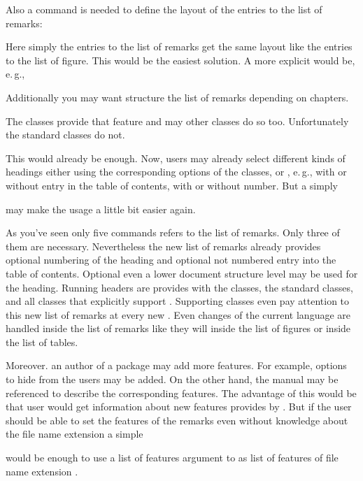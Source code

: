 Also a command is needed to define the layout of the entries
to the list of remarks:
\begin{lstcode}[belowskip=\dp\strutbox plus 1pt]
  \newcommand*{\l@remarkbox}{\l@figure}
\end{lstcode}
Here simply the entries to the list of remarks get the same layout like the
entries to the list of figure. This would be the easiest solution. A more
explicit would be, e.\,g.,
\begin{lstcode}[belowskip=\dp\strutbox plus 1pt]
  \newcommand*{\l@remarkbox}{\@dottedtocline{1}{1em}{1.5em}}
\end{lstcode}

Additionally you may want structure the list of
remarks depending on chapters.
\begin{lstcode}[belowskip=\dp\strutbox plus 1pt]
\end{lstcode}
The \KOMAScript{} classes provide that feature and may other classes do so
too. Unfortunately the standard classes do not.

This would already be enough. Now, users may already
select different kinds of headings either using the corresponding options of
the \KOMAScript{} classes, or , e.\,g., with or without entry
in the table of contents, with or without number. But a simply
\begin{lstcode}[belowskip=\dp\strutbox plus 1pt]
  \newcommand*{\listofremarkboxes}{\listoftoc{lor}}
\end{lstcode}
may make the usage a little bit easier again.

As you've seen only five commands refers to the list of remarks. Only three of
them are necessary. Nevertheless the new list of remarks already provides
optional numbering of the heading and optional not numbered entry into the
table of contents. Optional even a lower document structure level may be used
for the heading. Running headers are provides with the \KOMAScript{} classes,
the standard classes, and all classes that explicitly support
. Supporting classes even pay attention to this new list of
remarks at every new . Even changes of the current language are
handled inside the list of remarks like they will inside the list of figures
or inside the list of tables.

Moreover. an author of a package may add more
features. For example, options to hide  from the users may be
added. On the other hand, the  manual may be referenced to
describe the corresponding features. The advantage of this would be that user
would get information about new features provides by . But
if the user should be able to set the features of the remarks even without
knowledge about the file name extension  a simple
\begin{lstcode}[belowskip=\dp\strutbox plus 1pt]
  \newcommand*{\setupremarkboxes}{\setuptoc{lor}}
\end{lstcode}
would be enough to use a list of features argument to
 as list of features of file name extension .

